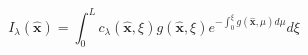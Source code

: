 \begin{equation}
I_\lambda(\hat{\mathbf{x}})=
\int_0^L c_\lambda(\hat{\mathbf{x}}, \xi)
g(\hat{\mathbf{x}},\xi)
e^{-\int_0^\xi g(\hat{\mathbf{x}},\mu)d\mu}
d\xi
\label{eq:volume_render_equation}
\end{equation}


